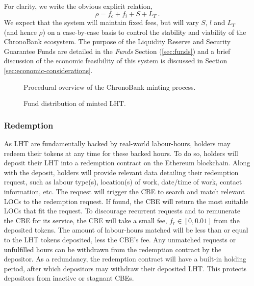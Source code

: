 \begin{multicols}{2}
\begin{itemize}
\end{itemize}
For clarity, we write the obvious explicit relation,
\begin{equation}
  \rho = f_c + f_i + S + L_T ~.
  \label{eq:rho}
\end{equation}
We expect that the system will maintain fixed fees, but will vary $S$, $l$ and $L_T$ (and hence $\rho$) on a case-by-case basis to control the stability and viability of the ChronoBank ecosystem. The purpose of the Liquidity Reserve and Security Guarantee Funds are detailed in the \textit{Funds} Section (\ref{sec:funds}) and a brief discussion of the economic feasibility of this system is discussed in Section \ref{sec:economic-considerations}.
\begin{figure}[H]
	\def\svgwidth{\columnwidth}
	
	\caption{Procedural overview of the ChronoBank minting process.}
	\label{fig:mint-sequence}
\end{figure}

\begin{figure}[H]
	\def\svgwidth{\columnwidth}
	
	\caption{Fund distribution of minted LHT.}
	\label{fig:mint-distribution}
\end{figure}

\subsubsection{Redemption}

As LHT are fundamentally backed by real-world labour-hours, holders may redeem their tokens at any time for these backed hours. To do so, holders will deposit their LHT  into a redemption contract on the Ethereum blockchain. Along with the deposit, holders will provide relevant data detailing their redemption request, such as labour type(s), location(s) of work, date/time of work, contact information, etc. The request will trigger the CBE to search and match relevant LOCs to the redemption request.  If found, the CBE will return the most suitable LOCs that fit the request. To discourage recurrent requests and to remunerate the CBE for its service, the CBE will take a small fee, $f_r \in [0,0.01]$ from the deposited tokens. The amount of labour-hours matched will be less than or equal to the LHT tokens deposited, less the CBE's fee. Any unmatched requests or unfulfilled hours can be withdrawn from the redemption contract by the depositor. As a redundancy, the redemption contract will have a built-in holding period, after which depositors may withdraw their deposited LHT. This protects depositors from inactive or stagnant CBEs. 


\end{multicols}
